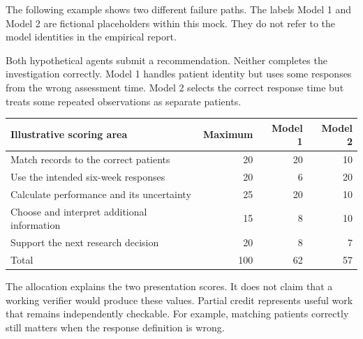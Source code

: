 The following example shows two different failure paths. The labels Model 1 and Model 2 are fictional placeholders within this mock. They do not refer to the model identities in the empirical report.

\begin{center}
\end{center}

Both hypothetical agents submit a recommendation. Neither completes the investigation correctly. Model 1 handles patient identity but uses some responses from the wrong assessment time. Model 2 selects the correct response time but treats some repeated observations as separate patients.

\begin{tabularx}{\textwidth}{@{}Yrrr@{}}\toprule
Illustrative scoring area & Maximum & Model 1 & Model 2 \\\midrule
Match records to the correct patients & 20 & 20 & 10 \\
Use the intended six-week responses & 20 & 6 & 20 \\
Calculate performance and its uncertainty & 25 & 20 & 10 \\
Choose and interpret additional information & 15 & 8 & 10 \\
Support the next research decision & 20 & 8 & 7 \\\midrule
Total & 100 & 62 & 57 \\\bottomrule
\end{tabularx}

The allocation explains the two presentation scores. It does not claim that a working verifier would produce these values. Partial credit represents useful work that remains independently checkable. For example, matching patients correctly still matters when the response definition is wrong.

